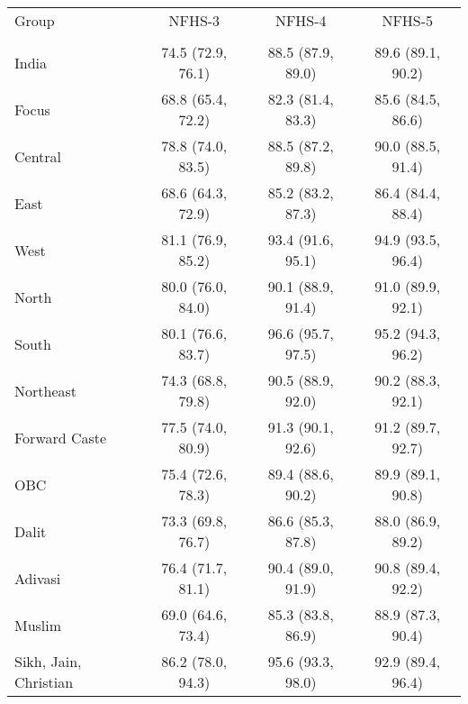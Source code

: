 \begin{tabular}{lccc}
\toprule
Group & NFHS-3 & NFHS-4 & NFHS-5 \\\\
\midrule
India&74.5 (72.9, 76.1)&88.5 (87.9, 89.0)&89.6 (89.1, 90.2)\\
Focus&68.8 (65.4, 72.2)&82.3 (81.4, 83.3)&85.6 (84.5, 86.6)\\
Central&78.8 (74.0, 83.5)&88.5 (87.2, 89.8)&90.0 (88.5, 91.4)\\
East&68.6 (64.3, 72.9)&85.2 (83.2, 87.3)&86.4 (84.4, 88.4)\\
West&81.1 (76.9, 85.2)&93.4 (91.6, 95.1)&94.9 (93.5, 96.4)\\
North&80.0 (76.0, 84.0)&90.1 (88.9, 91.4)&91.0 (89.9, 92.1)\\
South&80.1 (76.6, 83.7)&96.6 (95.7, 97.5)&95.2 (94.3, 96.2)\\
Northeast&74.3 (68.8, 79.8)&90.5 (88.9, 92.0)&90.2 (88.3, 92.1)\\
Forward Caste&77.5 (74.0, 80.9)&91.3 (90.1, 92.6)&91.2 (89.7, 92.7)\\
OBC&75.4 (72.6, 78.3)&89.4 (88.6, 90.2)&89.9 (89.1, 90.8)\\
Dalit&73.3 (69.8, 76.7)&86.6 (85.3, 87.8)&88.0 (86.9, 89.2)\\
Adivasi&76.4 (71.7, 81.1)&90.4 (89.0, 91.9)&90.8 (89.4, 92.2)\\
Muslim&69.0 (64.6, 73.4)&85.3 (83.8, 86.9)&88.9 (87.3, 90.4)\\
Sikh, Jain, Christian&86.2 (78.0, 94.3)&95.6 (93.3, 98.0)&92.9 (89.4, 96.4)\\
\bottomrule
\end{tabular}
